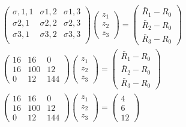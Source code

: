 \documentclass[12pt,a4paper]{article}
\begin{document}
		  \begin{align*}
		    &    \begin{pmatrix}
							\sigma,{1,1} & \sigma{1,2}  & \sigma{1,3}\\
							\sigma{2,1} & \sigma{2,2}  & \sigma{2,3}\\
							 \sigma{3,1} & \sigma{3,2}  & \sigma{3,3}\\
		  		\end{pmatrix} \begin{pmatrix}
		  				z_1 \\
		  				z_2\\
		  				z_3
		  		\end{pmatrix} = \begin{pmatrix}
		  				\bar{R}_1 - R_0\\
		  				\bar{R}_2 - R_0\\
		  				\bar{R}_3 - R_0
		  		\end{pmatrix}\\
		  		&   \begin{pmatrix}
		  					16 & 16 & 0 \\
		  					16 & 100 & 12\\
		  					0 & 12 & 144
		  		\end{pmatrix} \begin{pmatrix}
		  				z_1 \\
		  				z_2\\
		  				z_3
		  		\end{pmatrix} = \begin{pmatrix}
		  				\bar{R}_1 - R_0\\
		  				\bar{R}_2 - R_0\\
		  				\bar{R}_3 - R_0
		  		\end{pmatrix}\\
		  		&    \begin{pmatrix}
		  					16 & 16 & 0 \\
		  					16 & 100 & 12\\
		  					0 & 12 & 144
		  		\end{pmatrix} \begin{pmatrix}
		  				z_1 \\
		  				z_2\\
		  				z_3
		  		\end{pmatrix} = \begin{pmatrix}
							4\\ 6 \\ 12
		  		\end{pmatrix}
		  \end{align*}
\end{document}
